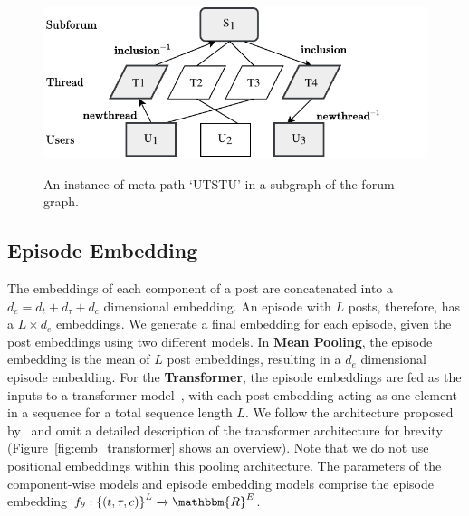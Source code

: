 \begin{figure}
    \centering
    \includegraphics[width=\linewidth,alt={A meta subgraph of the forum graph showing the meta-path UTSTU.}]{sysml/figures/metapathExample.pdf}
    \caption{An instance of meta-path ‘UTSTU’ in a subgraph of the forum graph.}
    \label{fig:metapath}
\end{figure}

\subsection{Episode Embedding}
The embeddings of each component of a post are concatenated into a $d_e = d_t + d_{\tau} + d_c$ dimensional embedding.
An episode with $L$ posts, therefore, has a $L \times d_e$ embeddings. 
We generate a final embedding for each episode, given the post embeddings using two different models.
In \textbf{Mean Pooling}, the episode embedding is the mean of $L$ post embeddings, resulting in a $d_e$ dimensional episode embedding.
For the \textbf{Transformer}, the episode embeddings are fed as the inputs to a transformer model~\cite{devlin2019bert,vaswani2017attention}, with each post embedding acting as one element in a sequence for a total sequence length $L$. 
We follow the architecture proposed by~\citet{andrews2019learning} and omit a detailed description of the transformer architecture for brevity (Figure~\ref{fig:emb_transformer} shows an overview).
Note that we do not use positional embeddings within this pooling architecture.
The parameters of the component-wise models and episode embedding models comprise the episode embedding $f_{\theta}: \left\{(t, \tau, c)\right\}^L \xrightarrow[]{} \mathbbm{R} ^ E$.

